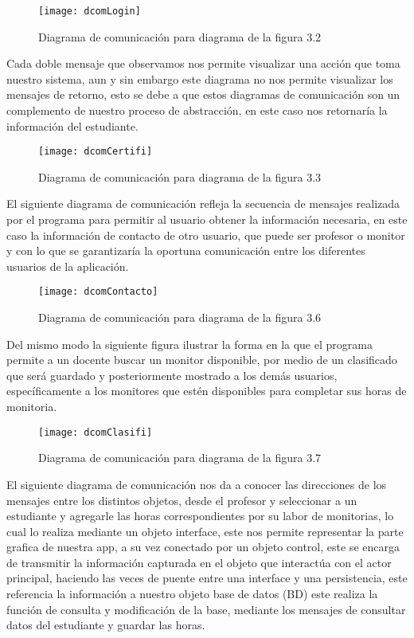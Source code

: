 \begin{figure}[H]
	\centering
	\texttt{[image: dcomLogin]}
    \centering
    \caption{Diagrama de comunicación para diagrama de la figura 3.2}
	\label{fig:dcomLogin}
\end{figure}
\clearpage
Cada doble mensaje que observamos nos permite visualizar una acción que toma nuestro sistema, aun y sin embargo este diagrama no nos permite visualizar los mensajes de retorno, esto se debe a que estos diagramas de comunicación son un complemento de nuestro proceso de abstracción, en este caso nos retornaría la información del estudiante. 
\begin{figure}[H]
	\centering
	\texttt{[image: dcomCertifi]}
    \centering
    \caption{Diagrama de comunicación para diagrama de la figura 3.3}
	\label{fig:dcomCertifi}
\end{figure}
\clearpage
El siguiente diagrama de comunicación refleja la secuencia de mensajes realizada por el programa para permitir al usuario obtener la información necesaria, en este caso la información de contacto de otro usuario, que puede ser profesor o monitor y con lo que se garantizaría la oportuna comunicación entre los diferentes usuarios de la aplicación. 
\begin{figure}[H]
	\centering
	\texttt{[image: dcomContacto]}
    \centering
    \caption{Diagrama de comunicación para diagrama de la figura 3.6}
	\label{fig:dcomContacto}
\end{figure}
\clearpage
Del mismo modo la siguiente figura ilustrar la forma en la que el programa permite a un docente buscar un monitor disponible, por medio de un clasificado que será guardado y posteriormente mostrado a los demás usuarios, específicamente a los monitores que estén disponibles para completar sus horas de monitoria.
\begin{figure}[H]
	\centering
	\texttt{[image: dcomClasifi]}
    \centering
    \caption{Diagrama de comunicación para diagrama de la figura 3.7}
	\label{fig:dcomClasifi}
\end{figure}
\clearpage
El siguiente diagrama de comunicación nos da a conocer las direcciones de los mensajes entre los distintos objetos, desde el profesor y seleccionar a un estudiante y agregarle las horas correspondientes por su labor de monitorias, lo cual lo realiza mediante un objeto interface, este nos permite representar la parte grafica de nuestra app, a su vez conectado por un objeto control, este se encarga de transmitir la información capturada en el objeto que interactúa con el actor principal, haciendo las veces de puente entre una interface y una persistencia, este referencia la información a nuestro objeto base de datos (BD) este realiza la función de consulta y modificación de la base, mediante los mensajes de consultar datos del estudiante y guardar las horas.
